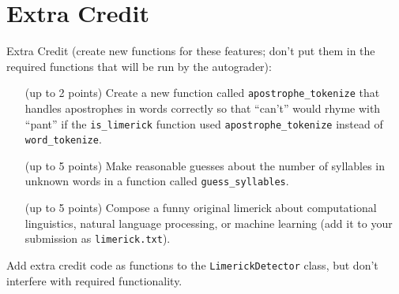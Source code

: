 \documentclass[11pt]{article}
\begin{document}
\section*{Extra Credit}

Extra Credit (create new functions for these features; don’t put them
in the required functions that will be run by the autograder):
\begin{itemize}
\item[(up to 2 points)] Create a new function called
  \texttt{apostrophe\_tokenize} that handles apostrophes in words correctly so
  that ``can’t'' would rhyme with ``pant'' if the \texttt{is\_limerick} function used \texttt{apostrophe\_tokenize} instead of \texttt{word\_tokenize}.
\item[(up to 5 points)] Make reasonable guesses about the number of syllables in unknown words in a function called \texttt{guess\_syllables}.
\item[(up to 5 points)] Compose a funny original limerick about
  computational linguistics, natural language processing, or machine
  learning (add it to your submission as \texttt{limerick.txt}).
\end{itemize}
Add extra credit code as functions to the \texttt{LimerickDetector}
class, but don't interfere with required functionality.
\end{document}
